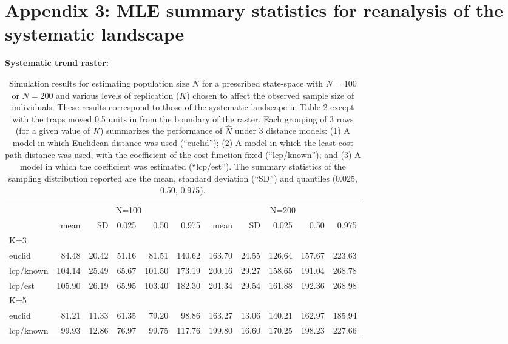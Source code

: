 \documentclass[12pt]{article}
\begin{document}
\newpage


\section*{Appendix 3:  MLE summary statistics for reanalysis of the
  systematic landscape}



\begin{table}[ht]
{\small
\caption{Simulation results for estimating population size $N$ for a prescribed state-space with
$N=100$ or $N=200$ and various levels of replication ($K$) chosen to affect the observed sample
size of individuals. These results correspond to those of the
systematic landscape in Table 2 except with the traps
moved 0.5 units in from the boundary of the raster.
Each grouping of 3 rows (for a given value of $K$) summarizes the
performance of $\hat{N}$ under 3 distance models: (1) A model in which
Euclidean distance was used (``euclid''); (2) A model in which the
least-cost path distance was used, with the coefficient of the cost
function fixed (``lcp/known''); and (3) A model in which the
coefficient was estimated (``lcp/est''). The summary statistics of the
sampling distribution reported are the mean, standard deviation
(``SD'') and quantiles (0.025, 0.50, 0.975).
}
{\bf Systematic trend raster:} \\
\begin{tabular}{l|rrrrr|rrrrr}
         & \multicolumn{5}{c}{N=100   } & \multicolumn{5}{c}{N=200  }  \\
         &   mean &  SD  & 0.025 & 0.50 & 0.975  & mean  & SD   & 0.025 & 0.50  & 0.975 \\ \hline
K=3      &        &      &       &      &        &       &      &       &       &       \\
euclid   &   84.48& 20.42& 51.16 & 81.51& 140.62 &163.70 &24.55 &126.64 &157.67 &223.63 \\
lcp/known&  104.14& 25.49& 65.67 &101.50& 173.19 &200.16 &29.27 &158.65 &191.04 &268.78\\
lcp/est  &  105.90& 26.19& 65.95 &103.40& 182.30 &201.34 &29.54 &161.88 &192.36 &268.98\\
K=5      &        &      &       &      &        &       &      &       &       &       \\
euclid   & 81.21  &11.33 &61.35  &79.20 & 98.86  &163.27 &13.06 &140.21 &162.97 &185.94\\
lcp/known& 99.93  &12.86 &76.97  &99.75 &117.76  &199.80 &16.60 &170.25 &198.23 &227.66\\

\end{tabular}}
\end{table}
\end{document}
